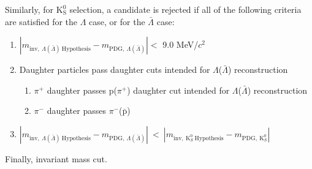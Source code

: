 \documentclass[ALICE,manyauthors]{cernphprep}
\newcommand{\Lam}{$\Lambda$\xspace}
\newcommand{\ALam}{$\bar{\Lambda}$\xspace}
\newcommand{\LamALam}{$\Lambda$($\bar{\Lambda}$)\xspace}
\newcommand{\Ks}{$\mathrm{K^{0}_{S}}$\xspace}
\begin{document}
Similarly, for \Ks selection, a candidate is rejected if all of the following criteria are satisfied for the \Lam case, or for the \ALam case:

\begin{enumerate}
 \item $\left|m_{\mathrm{inv}, \ \Lambda(\bar{\Lambda}) \ \mathrm{Hypothesis}} - m_{\mathrm{PDG},\ \Lambda(\bar{\Lambda})}\right| < $ 9.0 MeV/$c^{2}$
 \item Daughter particles pass daughter cuts intended for \LamALam reconstruction
 \begin{enumerate}
  \item $\pi^{+}$ daughter passes p($\pi^{+}$) daughter cut intended for \LamALam reconstruction
  \item $\pi^{-}$ daughter passes $\pi^{-}$($\bar{\mathrm{p}}$)
 \end{enumerate}
 \item $\left|m_{\mathrm{inv}, \ \Lambda(\bar{\Lambda}) \ \mathrm{Hypothesis}} - m_{\mathrm{PDG},\ \Lambda(\bar{\Lambda})}\right|~ < ~\left|m_{\mathrm{inv},~ \mathrm{K}^{0}_{S}~ \mathrm{Hypothesis}} - m_{\mathrm{PDG},~ \mathrm{K}^{0}_{S}}\right|$
\end{enumerate} 

Finally, invariant mass cut.
\end{document}
